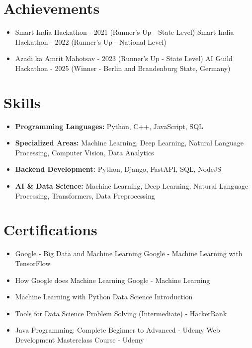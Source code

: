 \documentclass[a4paper,10pt]{article}
\begin{document}
\section*{Achievements}
\begin{itemize}
\item Smart India Hackathon - 2021 (Runner's Up - State Level) \hfill Smart India Hackathon - 2022 (Runner's Up - National Level)
\item Azadi ka Amrit Mahotsav - 2023 (Runner's Up - State Level) \hfill AI Guild Hackathon - 2025 (Winner - Berlin and Brandenburg State, Germany)
\end{itemize}

\section*{Skills}
\begin{itemize}
  \item \textbf{Programming Languages:} Python, C++, JavaScript, SQL
  \item \textbf{Specialized Areas:} Machine Learning, Deep Learning, Natural Language Processing, Computer Vision, Data Analytics
  \item \textbf{Backend Development:} Python, Django, FastAPI, SQL, NodeJS
  \item \textbf{AI \& Data Science:} Machine Learning, Deep Learning, Natural Language Processing, Transformers, Data Preprocessing
\end{itemize}

\section*{Certifications}
\begin{itemize}
\item Google - Big Data and Machine Learning \hfill Google - Machine Learning with TensorFlow
\item How Google does Machine Learning \hfill Google - Machine Learning
\item Machine Learning with Python \hfill Data Science Introduction
\item Tools for Data Science \hfill Problem Solving (Intermediate) - HackerRank
\item Java Programming: Complete Beginner to Advanced - Udemy \hfill Web Development Masterclass Course - Udemy
\end{itemize}
\end{document}
